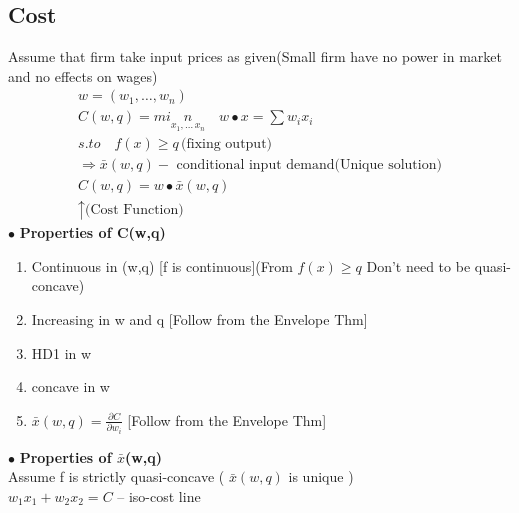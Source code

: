 \documentclass[letterpaper,13pt,single,pdftex]{scrartcl}
\begin{document}
\subsection{Cost}
Assume that firm take input prices as given(Small firm have no power in market and no effects on wages)
\begin{gather*}
    w=(w_1,\dots,w_n)\\
    C(w,q) = min\limits_{x_1,\dots\,x_n} \quad w\bullet x = \sum w_ix_i\\
    s .to \quad f(x) \ge q \,\text{(fixing output)}\\
    \Rightarrow \bar{x}(w,q) -\text{ conditional input demand(Unique solution)}\\
    C(w,q) = w\bullet \bar{x}(w,q) \\
    \uparrow \text{(Cost Function)}
\end{gather*}
\newpage
$\bullet$ \textbf{Properties of C(w,q)}
\begin{enumerate}
    \item Continuous in (w,q) [f is continuous](From $f(x) \ge q$ Don't need to be quasi-concave)
    \item Increasing in w and q [Follow from the Envelope Thm]
    \item HD1 in w
    \item concave in w
    \item$\bar{x}(w,q) = \frac{\partial C}{\partial w_i}$  [Follow from the Envelope Thm]
\end{enumerate}
$\bullet$ \textbf{Properties of $\bar{x}$(w,q)}\\
Assume f is strictly quasi-concave ( $\bar{x}(w,q)$ is unique )
\vspace{50mm}\\
$w_1x_1+w_2x_2 = C$ -- iso-cost line
\end{document}
